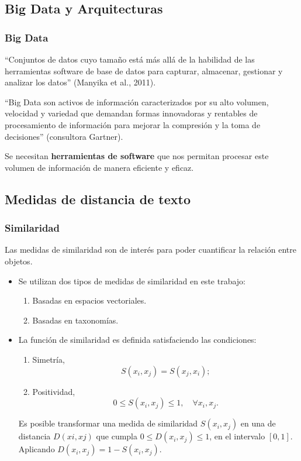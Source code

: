 \subsection{Big Data y Arquitecturas}
\begin{frame}
	\frametitle{Big Data}
		\begin{tcolorbox}[colback=blue!5,colframe=blue!40!black,title=Big Data]
			``Conjuntos de datos cuyo tamaño está más allá de la habilidad de las herramientas software de base de datos para capturar, almacenar, gestionar y analizar los datos'' (Manyika et al., 2011).

			\bigskip

			``Big Data son activos de información caracterizados por su alto volumen, velocidad y variedad que demandan formas innovadoras y rentables de procesamiento de información para mejorar la compresión y la toma de decisiones'' (consultora Gartner).
		\end{tcolorbox}
		\bigskip

		\begin{center}
			Se necesitan \textbf{herramientas de software} que nos permitan procesar este volumen de información de manera eficiente y eficaz.
		\end{center}
\end{frame}

\subsection{Medidas de distancia de texto}
\begin{frame}
	\frametitle{Similaridad}
	Las medidas de similaridad son de interés para poder cuantificar la relación entre objetos.
	\bigskip
	\begin{itemize}
		\item Se utilizan dos tipos de medidas de similaridad en este trabajo:
		\begin{enumerate}[<*>]
			\item Basadas en espacios vectoriales.
			\item Basadas en taxonomías.
		\end{enumerate}

		\bigskip
		\item
		La función de similaridad es definida satisfaciendo las condiciones:
		\begin{enumerate}[<*>]
			\item Simetría,
			\[S(x_i,x_j)=S(x_j,x_i);\]

			\item Positividad,
			\[0 \leq S(x_i,x_j) \leq 1, \quad \forall x_i,x_j.\]
		\end{enumerate}
		\medskip
		Es posible transformar una medida de similaridad \(S(x_i,x_j)\) en una de distancia \(D(xi,xj)\) que cumpla \(0 \leq D(x_i,x_j) \leq 1\), en el intervalo \([0,1]\). Aplicando \(D(x_i,x_j) = 1 - S(x_i,x_j)\).
	\end{itemize}
\end{frame}

